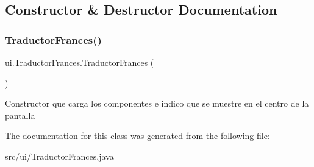 \subsection{Constructor \& Destructor Documentation}
\mbox{\label{classui_1_1_traductor_frances_a03d13843751898646109a36fd9bf3d14}} 
\subsubsection{\texorpdfstring{TraductorFrances()}{TraductorFrances()}}
{\footnotesize\ttfamily ui.\+Traductor\+Frances.\+Traductor\+Frances (\begin{DoxyParamCaption}{ }\end{DoxyParamCaption})\hspace{0.3cm}{\ttfamily [inline]}}

Constructor que carga los componentes e indico que se muestre en el centro de la pantalla 

The documentation for this class was generated from the following file\+:\begin{DoxyCompactItemize}
\item 
src/ui/Traductor\+Frances.\+java\end{DoxyCompactItemize}
